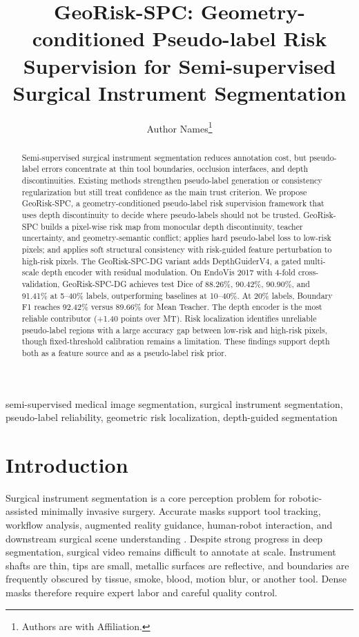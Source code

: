 \documentclass[journal]{IEEEtran}
\begin{document}
\title{GeoRisk-SPC: Geometry-conditioned Pseudo-label Risk Supervision for Semi-supervised Surgical Instrument Segmentation}

\author{Author Names\thanks{Authors are with Affiliation.}}

\maketitle

\begin{abstract}
Semi-supervised surgical instrument segmentation reduces annotation cost, but pseudo-label errors concentrate at thin tool boundaries, occlusion interfaces, and depth discontinuities. Existing methods strengthen pseudo-label generation or consistency regularization but still treat confidence as the main trust criterion. We propose GeoRisk-SPC, a geometry-conditioned pseudo-label risk supervision framework that uses depth discontinuity to decide where pseudo-labels should not be trusted. GeoRisk-SPC builds a pixel-wise risk map from monocular depth discontinuity, teacher uncertainty, and geometry-semantic conflict; applies hard pseudo-label loss to low-risk pixels; and applies soft structural consistency with risk-guided feature perturbation to high-risk pixels. The GeoRisk-SPC-DG variant adds DepthGuiderV4, a gated multi-scale depth encoder with residual modulation. On EndoVis 2017 with 4-fold cross-validation, GeoRisk-SPC-DG achieves test Dice of 88.26\%, 90.42\%, 90.90\%, and 91.41\% at 5--40\% labels, outperforming baselines at 10--40\%. At 20\% labels, Boundary F1 reaches 92.42\% versus 89.66\% for Mean Teacher. The depth encoder is the most reliable contributor (+1.40 points over MT). Risk localization identifies unreliable pseudo-label regions with a large accuracy gap between low-risk and high-risk pixels, though fixed-threshold calibration remains a limitation. These findings support depth both as a feature source and as a pseudo-label risk prior.
\end{abstract}

\begin{IEEEkeywords}
semi-supervised medical image segmentation, surgical instrument segmentation, pseudo-label reliability, geometric risk localization, depth-guided segmentation
\end{IEEEkeywords}

\section{Introduction}
Surgical instrument segmentation is a core perception problem for robotic-assisted minimally invasive surgery. Accurate masks support tool tracking, workflow analysis, augmented reality guidance, human-robot interaction, and downstream surgical scene understanding \cite{maierhein2017surgical,allan20192017,rueckert2024methods}. Despite strong progress in deep segmentation, surgical video remains difficult to annotate at scale. Instrument shafts are thin, tips are small, metallic surfaces are reflective, and boundaries are frequently obscured by tissue, smoke, blood, motion blur, or another tool. Dense masks therefore require expert labor and careful quality control.
\end{document}
